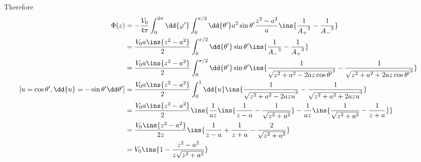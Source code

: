 Therefore
\begin{align}
	\Phi(z) &= -\frac{V_0}{4\pi}\int_{0}^{2\pi}\dd{\varphi'}\int_{0}^{\pi/2}\dd{\theta'}a^2\sin\theta'\frac{z^2-a^2}{a}\ins{\frac{1}{{A_+}^3}-\frac{1}{{A_-}^3}}\\
	&= \frac{V_0 a \ins{z^2-a^2}}{2}\int_{0}^{\pi/2}\dd{\theta'}\sin\theta'\ins{\frac{1}{{A_-}^3}-\frac{1}{{A_+}^3}}\\
	&= \frac{V_0 a \ins{z^2-a^2}}{2}\int_{0}^{\pi/2}\dd{\theta'}\sin\theta'\ins{\frac{1}{{\sqrt{z^2+a^2-2az\cos\theta'}}^3}-\frac{1}{{\sqrt{z^2+a^2+2az\cos\theta'}}^3}}\\
	\left[u=\cos\theta',\dd{u}=-\sin\theta'\dd\theta'\right] &= \frac{V_0 a \ins{z^2-a^2}}{2}\int_{0}^{1}\dd{u}\ins{\frac{1}{{\sqrt{z^2+a^2-2azu}}^3}-\frac{1}{{\sqrt{z^2+a^2+2azu}}^3}}\\
	&= \frac{V_0 a \ins{z^2-a^2}}{2}\ins{\frac{1}{az}\ins{\frac{1}{z-a}-\frac{1}{\sqrt{z^2+a^2}}}-\frac{1}{az}\ins{\frac{1}{\sqrt{z^2+a^2}}-\frac{1}{z+a}}}\\
	&= \frac{V_0 \ins{z^2-a^2}}{2z}\ins{\frac{1}{z-a}+\frac{1}{z+a}-\frac{2}{\sqrt{z^2+a^2}}}\\
	&= V_0\ins{1-\frac{z^2-a^2}{z\sqrt{z^2+a^2}}}
\end{align}

